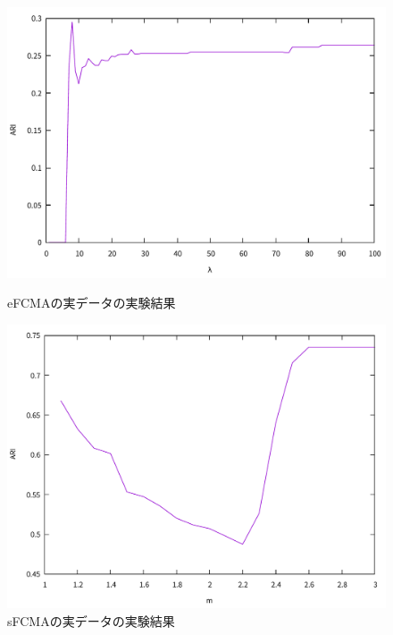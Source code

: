 \documentclass[twocolumn, a4paper]{icethesisabst}
\begin{document}
\begin{figure}[htbp]
 \centering
 \begin{minipage}{0.43\hsize}
  \includegraphics[width=\linewidth]{eFCMA_ARI.pdf}
  \caption{eFCMAの実データの実験結果}
  \label{fig:eFCMA_ARI}
 \end{minipage}
 \begin{minipage}{0.43\hsize}
  \includegraphics[width=\linewidth]{sFCMA_ARI.pdf}
  \caption{sFCMAの実データの実験結果}
  \label{fig:sFCMA_ARI}
 \end{minipage}
 \begin{minipage}{0.43\hsize}

\end{minipage}
\end{figure}
\end{document}
